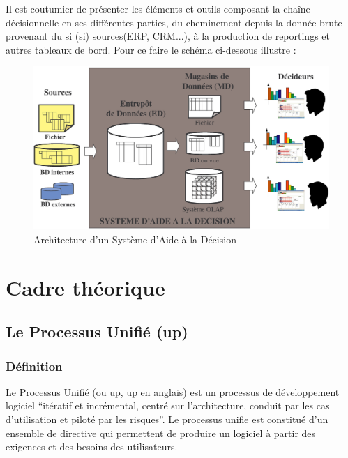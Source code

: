             Il est coutumier de présenter les éléments et outils composant
            la chaîne décisionnelle en ses différentes parties, du cheminement
            depuis la donnée brute provenant du \acrlong{si} (\acrshort{si})
            sources(ERP, CRM...), à la production de reportings et autres tableaux
            de bord. Pour ce faire le schéma ci-dessous illustre :
            \par
            \begin{figure}[h]
                \centering
                \includegraphics[width=130mm]{images/architecture-bi.jpg}
                \caption{Architecture d’un Système d’Aide à la Décision}
                \label{fig:archiBi}
            \end{figure}
    \section[Cadre théorique]{Cadre théorique}
        \subsection[Le Processus Unifié (UP)]{Le Processus Unifié (\acrshort{up})}
            \subsubsection[Définition]{Définition}    
            Le Processus Unifié (ou \acrshort{up}, \acrlong{up} en anglais) est un
            processus de développement logiciel \enquote{itératif et incrémental,
            centré sur l’architecture, conduit par les cas d’utilisation
            et piloté par les risques}. \cite*{Roques2008} Le processus unifie
            est constitué d’un ensemble de directive qui permettent de produire
            un logiciel à partir des exigences et des besoins des utilisateurs.
